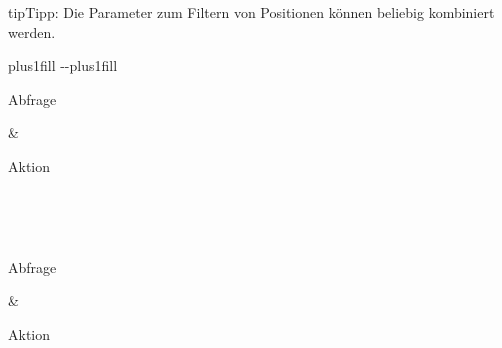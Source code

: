 \documentclass[letterpaper,10pt,german]{sphinxmanual}
\begin{document}
\begin{sphinxadmonition}{tip}{Tipp:}
\sphinxAtStartPar
Die Parameter zum Filtern von Positionen können beliebig kombiniert werden.
\end{sphinxadmonition}


\begin{savenotes}
\sphinxatlongtablestart
\sphinxthistablewithglobalstyle
\makeatletter
  \LTleft \@totalleftmargin plus1fill
  \LTright\dimexpr\columnwidth-\@totalleftmargin-\linewidth\relax plus1fill
\makeatother
\begin{longtable}{}
\sphinxtoprule
\begin{varwidth}[t]{}
\sphinxstyletheadfamily \sphinxAtStartPar
Abfrage
\sphinxbeforeendvarwidth
\end{varwidth}%
&\begin{varwidth}[t]{}
\sphinxstyletheadfamily \sphinxAtStartPar
Aktion
\sphinxbeforeendvarwidth
\end{varwidth}%
\\
\sphinxmidrule
\endfirsthead

\\
\sphinxtoprule
\begin{varwidth}[t]{}
\sphinxstyletheadfamily \sphinxAtStartPar
Abfrage
\sphinxbeforeendvarwidth
\end{varwidth}%
&\begin{varwidth}[t]{}
\sphinxstyletheadfamily \sphinxAtStartPar
Aktion
\sphinxbeforeendvarwidth
\end{varwidth}%
\\
\sphinxmidrule
\endhead

\sphinxbottomrule
{}\\
\endfoot


\end{longtable}
\end{savenotes}
\end{document}
